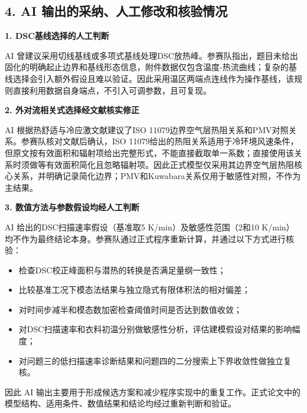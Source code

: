 \subsection*{4. AI 输出的采纳、人工修改和核验情况}

\noindent\textbf{1. DSC基线选择的人工判断}\par
AI 曾建议采用切线基线或多项式基线处理DSC放热峰。参赛队指出，题目未给出固化的明确起止边界和基线形态信息，附件数据仅包含温度-热流曲线；复杂的基线选择会引入额外假设且难以验证。因此采用温区两端点连线作为操作基线，该规则直接利用数据自身端点，不引入可调参数，且可复现。

\noindent\textbf{2. 外对流相关式选择经文献核实修正}\par
AI 根据热舒适与冷应激文献建议了ISO 11079边界空气层热阻关系和PMV对照关系。参赛队核对文献后确认，ISO 11079给出的热阻关系适用于冷环境风速条件，但原文按有效面积和辐射项给出完整形式，不能直接截取单一系数；直接使用该关系时须做等有效面积简化且忽略辐射项。因此正式模型仅采用其边界空气层热阻核心关系，并明确记录简化边界；PMV和Kuwabara关系仅用于敏感性对照，不作为主结果。

\noindent\textbf{3. 数值方法与参数假设均经人工判断}\par
AI 给出的DSC扫描速率假设（基准取5 K/min）及敏感性范围（2和10 K/min）均不作为最终结论本身。参赛队通过正式程序重新计算，并通过以下方式进行核验：
\begin{itemize}
  \item 检查DSC校正峰面积与潜热的转换是否满足量纲一致性；
  \item 比较基准工况下模态法结果与独立隐式有限体积法的相对偏差；
  \item 对时间步减半和模态数加密检查阈值时间是否达到数值收敛；
  \item 对DSC扫描速率和衣料初温分别做敏感性分析，评估建模假设对结果的影响幅度；
  \item 对问题三的低扫描速率诊断结果和问题四的二分搜索上下界收敛性做独立复核。
\end{itemize}

因此 AI 输出主要用于形成候选方案和减少程序实现中的重复工作。正式论文中的模型结构、适用条件、数值结果和结论均经过重新判断和验证。
